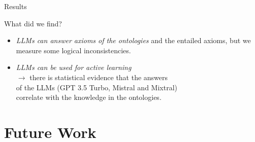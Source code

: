 \documentclass[presentation]{beamer}\mode<presentation>{\usetheme{blackAMSBolognaFC}}
\begin{document}
\begin{frame}[c]{Results}


    What did we find?
    \vfill
    \begin{itemize}
        \item \emph{LLMs can answer axioms of the ontologies} and the entailed axioms, but we measure some logical inconsistencies.
        \vfill
        \item \emph{LLMs can be used for active learning}
        \\
        $\rightarrow$ there is statistical evidence that the answers
        \\
        of the LLMs (GPT 3.5 Turbo, Mistral and Mixtral)
        \\
        correlate with the knowledge in the ontologies.
    \end{itemize}

\end{frame}

\section{Future Work}
\end{document}
